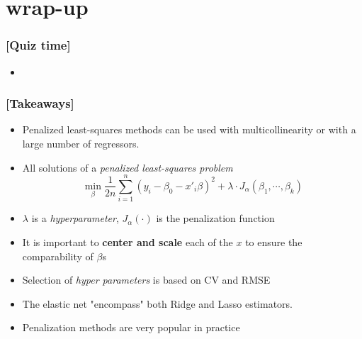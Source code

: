 \documentclass[xcolor=x11names,compress, handhouts]{beamer}
\renewcommand{\(}{\begin{columns}}
\renewcommand{\)}{\end{columns}}
\newcommand{\<}[1]{\begin{column}{#1}}
\renewcommand{\>}{\end{column}}
\begin{document}
\section{wrap-up}

\begin{frame} %
\frametitle{\textcolor{brique}{[Quiz time]}}
\pause
\begin{itemize}[<+->]
  \item[]
 \end{itemize}
\end{frame}



\begin{frame} %
\frametitle{\textcolor{brique}{[Takeaways]}}
\begin{itemize}[<+->]
\item Penalized least-squares methods can be used with multicollinearity or with a large number of regressors.
\item All solutions of a \textit{penalized least-squares problem}$$
\min_{\beta} \frac{1}{2n}
     \sum_{i=1}^{n}{ \left( y_i - \beta_0 - x'_i\beta\right)^{2} } +
\lambda \cdot J_{\alpha}(\beta_1, \cdots, \beta_k)
$$
\item[] $\lambda$ is a \textit{hyperparameter}, $J_{\alpha}(\cdot)$ is the penalization function
\item It is important to \textbf{center and scale}  each of the $x$ to ensure the comparability of $\beta$s
\item  Selection of \textit{hyper parameters} is based on CV and RMSE
\item The elastic net "encompass" both Ridge and Lasso estimators.
\item Penalization methods are very popular in practice
\end{itemize}
\end{frame}
\end{document}
